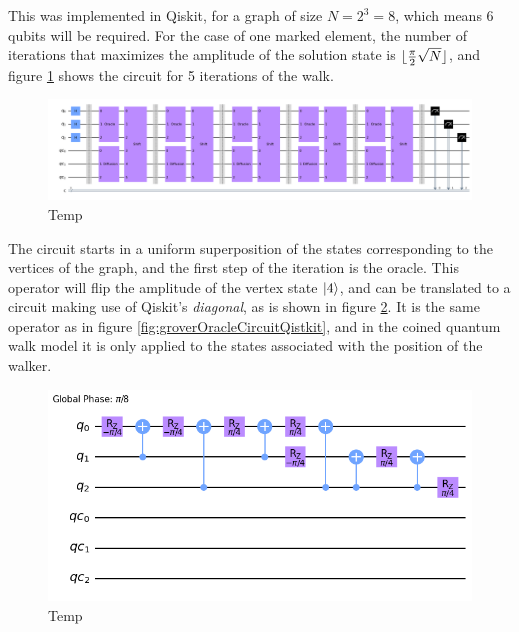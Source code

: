 \documentclass[../../dissertation.tex]{subfiles}
\begin{document}
\par
This was implemented in Qiskit, for a graph of size $N=2^3=8$, which means $6$ qubits will be required. For the case of one marked element, the number of iterations that maximizes the amplitude of the solution state is $\lfloor\frac{\pi}{2} \sqrt{N}\rfloor$, and figure \ref{fig:coinedQWSearchCircuitQistkit}
shows the circuit for 5 iterations of the walk.
\begin{figure}[!h]
	\centering
	\includegraphics[scale=0.21]{img/Qiskit/CoinedQuantumWalk/Search/Circuits/CoinedSearchQiskitCirc_N3_M0_S5.png}
	\caption{Temp} 
	\label{fig:coinedQWSearchCircuitQistkit}
\end{figure}\par
The circuit starts in a uniform superposition of the states corresponding to the vertices of the graph, and the first step of the iteration is the oracle. This operator will flip the amplitude of the vertex state $\ket{4}$, and can be translated to a circuit making use of Qiskit's \textit{diagonal}, as is shown in figure \ref{fig:coinedQWSearchOracleCircuitQistkit}. It is the same operator as in figure \ref{fig:groverOracleCircuitQistkit}, and in the coined quantum walk model it is only applied to the states associated with the position of the walker.
\begin{figure}[!h]
	\centering
	\includegraphics[scale=0.30]{img/Qiskit/CoinedQuantumWalk/Search/Circuits/CoinedSearchQiskitCircOracle_N3_M4_S5.png}
	\caption{Temp} 
	\label{fig:coinedQWSearchOracleCircuitQistkit}
\end{figure}
\end{document}
